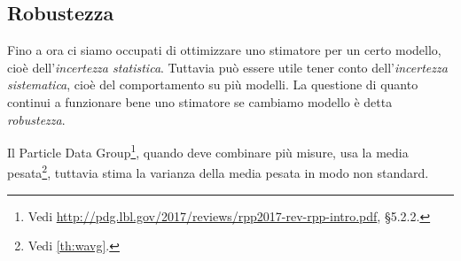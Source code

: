
\subsection{Robustezza}

Fino a ora ci siamo occupati di ottimizzare uno stimatore per un certo modello,
cioè dell'\emph{incertezza statistica}.
Tuttavia può essere utile tener conto dell'\emph{incertezza sistematica},
cioè del comportamento su più modelli.
La questione di quanto continui a funzionare bene uno stimatore se cambiamo modello è detta \emph{robustezza}.

\begin{example}
	Il Particle Data Group\footnote{Vedi \url{http://pdg.lbl.gov/2017/reviews/rpp2017-rev-rpp-intro.pdf}, §5.2.2.}, quando deve combinare più misure, usa la media pesata\footnote{Vedi \autoref{th:wavg}.}, tuttavia stima la varianza della media pesata in modo non standard.
\end{example}

